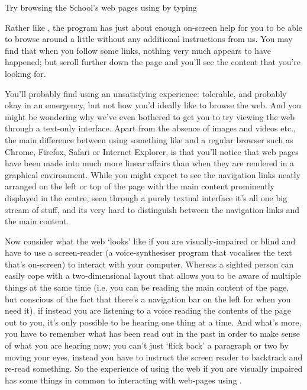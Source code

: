 
Try browsing the School's web pages using  by typing


Rather like , the  program has just about enough on-screen help for you to be able to browse around a little without any additional instructions from us.  You may find that when you follow some links, nothing very much appears to have happened; but scroll further down the page and you'll see the content that you're looking for.

You'll probably find using  an unsatisfying experience: tolerable, and probably okay in an emergency, but not how you'd ideally like to browse the web. And you might be wondering why we've even bothered to get you to try viewing the web through a text-only interface. Apart from the absence of images and videos etc., the main difference between using something like  and a regular browser such as Chrome, Firefox, Safari or Internet Explorer, is that you'll notice that web pages have been made into much more linear affairs than when they are rendered in a graphical environment. While you might expect to see the navigation links neatly arranged on the left or top of the page with the main content prominently displayed in the centre, seen through a purely textual interface it's all one big stream of stuff, and its very hard to distinguish between the navigation links and the main content. 

Now consider what the web `looks' like if you are visually-impaired or blind and have to use a screen-reader (a voice-synthesiser program that vocalises the text that's on-screen) to interact with your computer. Whereas a sighted person can easily cope with a two-dimensional layout that allows you to be aware of multiple things at the same time (i.e. you can be reading the main content of the page, but conscious of the fact that there's a navigation bar on the left for when you need it), if instead you are listening to a voice reading the contents of the page out to you, it's only possible to be hearing one thing at a time. And what's more, you have to remember what has been read out in the past in order to make sense of what you are hearing now; you can't just `flick back' a paragraph or two by moving your eyes, instead you have to instruct the screen reader to backtrack and re-read something. So the experience of using the web if you are visually impaired has some things in common to interacting with web-pages using . 

